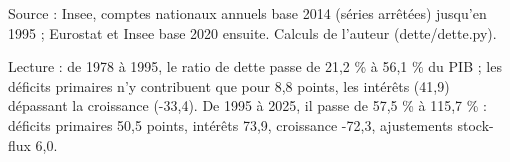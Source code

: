 Source : Insee, comptes nationaux annuels base 2014 (séries arrêtées) jusqu'en 1995 ; Eurostat et Insee base 2020 ensuite. Calculs de l'auteur (dette/dette.py).\par Lecture : de 1978 à 1995, le ratio de dette passe de 21,2 \% à 56,1 \% du PIB ; les déficits primaires n'y contribuent que pour 8,8 points, les intérêts (41,9) dépassant la croissance (-33,4). De 1995 à 2025, il passe de 57,5 \% à 115,7 \% : déficits primaires 50,5 points, intérêts 73,9, croissance -72,3, ajustements stock-flux 6,0.
